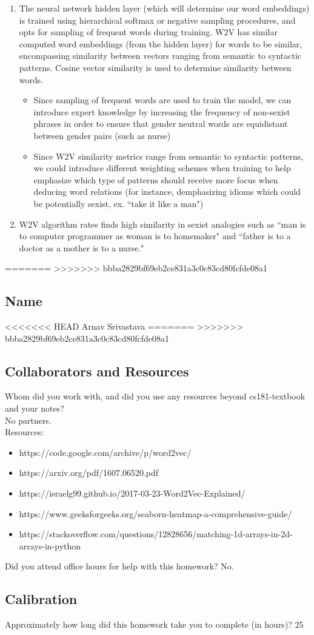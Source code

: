 \documentclass[submit]{harvardml}
\begin{document}
\begin{enumerate}
\begin{itemize}
    \end{itemize}
    \item The neural network hidden layer (which will determine our word embeddings) is trained using hierarchical softmax or negative sampling procedures, and opts for sampling of frequent words during training. W2V has similar computed word embeddings (from the hidden layer) for words to be similar, encompassing similarity between vectors ranging from semantic to syntactic patterns. Cosine vector similarity is used to determine similarity between words.
    \begin{itemize}
        \item Since sampling of frequent words are used to train the model, we can introduce expert knowledge by increasing the frequency of non-sexist phrases in order to ensure that gender neutral words are equidistant between gender pairs (such as nurse) 
        \item Since W2V similarity metrics range from semantic to syntactic patterns, we could introduce different weighting schemes when training to help emphasize which type of patterns should receive more focus when deducing word relations (for instance, demphasizing idioms which could be potentially sexist, ex. ``take it like a man")
    \end{itemize}
    \item W2V algorithm rates finds high similarity in sexist analogies such as ``man is to
computer programmer as woman is to homemaker" and ``father is to a doctor as a mother is to a nurse."

\end{enumerate}
=======
>>>>>>> bbba2829bf69eb2ce831a3c0c83cd80fcfde08a1
\newpage
\subsection*{Name}
<<<<<<< HEAD
Arnav Srivastava
=======
>>>>>>> bbba2829bf69eb2ce831a3c0c83cd80fcfde08a1
\subsection*{Collaborators and Resources}
Whom did you work with, and did you use any resources beyond cs181-textbook and your notes?\\
No partners.
\\
Resources:
\begin{itemize}
    \item https://code.google.com/archive/p/word2vec/
    \item https://arxiv.org/pdf/1607.06520.pdf
    \item https://israelg99.github.io/2017-03-23-Word2Vec-Explained/ 
    \item https://www.geeksforgeeks.org/seaborn-heatmap-a-comprehensive-guide/
    \item https://stackoverflow.com/questions/12828656/matching-1d-arrays-in-2d-arrays-in-python
\end{itemize}
Did you attend office hours for help with this homework?
No.
\subsection*{Calibration}
Approximately how long did this homework take you to complete (in hours)? 
25
\end{document}
